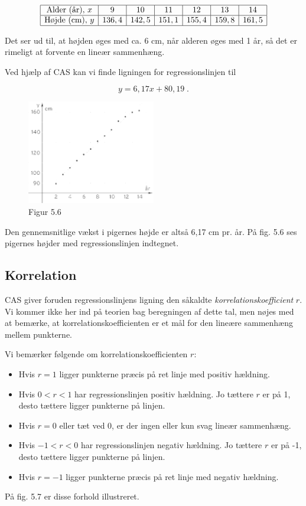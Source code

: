 \documentclass[12pt,oneside,a4paper]{article}
\begin{document}
$$
\begin{array}{|c|c|c|c|c|c|c|}
    \hline
    \mbox{Alder (år)},\, x  & 9  & 10 & 11&  12 & 13 & 14 \\
    \hline
    \mbox{Højde (cm)},\, y  & 136,4 &  142,5 &  151,1 &  155,4 &  159,8 &  161,5 \\
    \hline
\end{array}
$$

Det ser ud til, at højden øges med ca. 6 cm, når alderen øges med 1 år, så det
er rimeligt at forvente en lineær sammenhæng.

Ved hjælp af CAS kan vi finde ligningen for regressionslinjen til

$$
y = 6,17x + 80,19 \; .
$$

\begin{figure}[ht]
    \centering
    \includegraphics[width=0.5\textwidth]{fig56}
    \caption{Figur 5.6}
    \label{fig56}
\end{figure}

Den gennemsnitlige vækst i pigernes højde er altså 6,17 cm pr. år. På fig. 5.6
ses pigernes højder med regressionslinjen indtegnet.

\subsection{Korrelation}
CAS giver foruden regressionslinjens ligning den såkaldte {\em
korrelations\-koef\-fi\-cient} $r$. Vi kommer ikke her ind på teorien bag
beregningen af dette tal, men nøjes med at bemærke, at
korrelationskoefficienten er et mål for den lineære sammenhæng mellem
punkterne.

Vi bemærker følgende om korrelationskoefficienten $r$:

\begin{itemize}
    \item Hvis $r = 1$ ligger punkterne præcis på ret linje med positiv hældning.
    \item Hvis $0 < r < 1$ har regressionslinjen positiv hældning. Jo tættere $r$
        er på 1, desto tættere ligger punkterne på linjen.
    \item Hvis $r = 0$ eller tæt ved 0, er der ingen eller kun svag lineær sammenhæng.
    \item Hvis $-1 < r < 0$ har regressionslinjen negativ hældning. Jo tættere $r$
        er på -1, desto tættere ligger punkterne på linjen.
    \item Hvis $r = -1$ ligger punkterne præcis på ret linje med negativ hældning. 
\end{itemize}
På fig. 5.7 er disse forhold illustreret.
\end{document}
